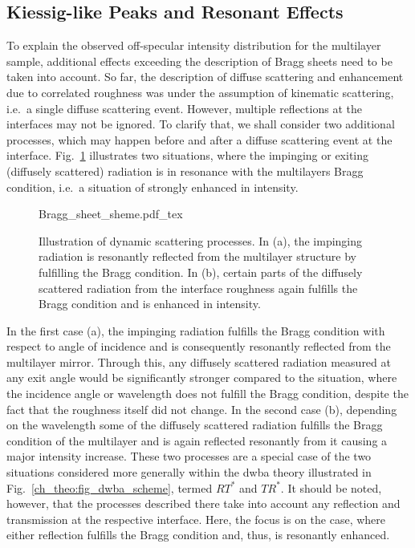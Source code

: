 \subsection{Kiessig-like Peaks and Resonant Effects}
To explain the observed off-specular intensity distribution for the multilayer sample, additional effects exceeding the description of Bragg sheets need to be taken into account. So far, the description of diffuse scattering and enhancement due to correlated roughness was under the assumption of kinematic scattering, i.e.~a single diffuse scattering event. However, multiple reflections at the interfaces may not be ignored. To clarify that, we shall consider two additional processes, which may happen before and after a diffuse scattering event at the interface. Fig.~\ref{ch_diff:fig_kiessig_like_peaks_scheme} illustrates two situations, where the impinging or exiting (diffusely scattered) radiation is in resonance with the multilayers Bragg condition, i.e.~a situation of strongly enhanced in intensity.
\begin{figure}[htb]
    {Bragg_sheet_sheme.pdf_tex}
    \caption[Illustration of dynamic scattering processes.]{Illustration of dynamic scattering processes. In (a), the impinging radiation is resonantly reflected from the multilayer structure by fulfilling the Bragg condition. In (b), certain parts of the diffusely scattered radiation from the interface roughness again fulfills the Bragg condition and is enhanced in intensity.}
    \label{ch_diff:fig_kiessig_like_peaks_scheme}
\end{figure}
In the first case (a), the impinging radiation fulfills the Bragg condition with respect to angle of incidence and is consequently resonantly reflected from the multilayer mirror. Through this, any diffusely scattered radiation measured at any exit angle would be significantly stronger compared to the situation, where the incidence angle or wavelength does not fulfill the Bragg condition, despite the fact that the roughness itself did not change. In the second case (b), depending on the wavelength some of the diffusely scattered radiation fulfills the Bragg condition of the multilayer and is again reflected resonantly from it causing a major intensity increase. These two processes are a special case of the two situations considered more generally within the \gls{dwba} theory illustrated in Fig.~\ref{ch_theo:fig_dwba_scheme}, termed $R T^*$ and $T R^*$. It should be noted, however, that the processes described there take into account any reflection and transmission at the respective interface. Here, the focus is on the case, where either reflection fulfills the Bragg condition and, thus, is resonantly enhanced.

